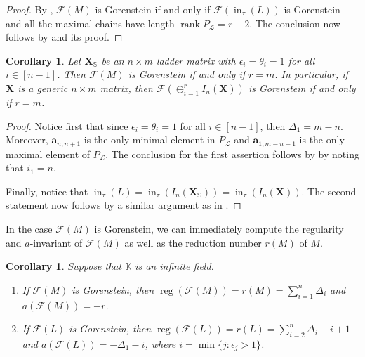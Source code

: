 \documentclass[11pt,a4paper,reqno,dvipsnames]{amsart}
\theoremstyle{plain}
\newtheorem{Corollary}[Theorem]{Corollary}
\theoremstyle{definition}
\newtheorem{Assumptions and Discussion}[Theorem]{Assumptions and Discussion}
\theoremstyle{remark}
\def\ini{\operatorname{in}}
\def\KK{{\mathbb K}}
\newcommand\bda{{\bm a}}
\newcommand\bfX{\mathbf{X}}
\newcommand\bfS{\mathbb{S}}
\newcommand\calF{\mathcal{F}}
\newcommand\calL{\mathcal{L}}
\newcommand{\rank}{\operatorname{rank}}
\def\reg{\operatorname{reg}}
\begin{document}
\begin{proof}
By , $\calF(M)$ is Gorenstein if and only if $\calF(\ini_{\tau}(L))$ is Gorenstein and all the maximal chains have length $\rank P_{\calL}=r-2$. The conclusion now follows by  and its proof.
\end{proof}

 



\begin{Corollary}
    Let $\bfX_{\bfS}$ be an $n\times m$ ladder matrix with $\epsilon_i=\theta_i=1$ for all $i\in [n-1]$.  Then $\calF(M)$ is Gorenstein if and only if $r=m$. In particular, if $\bfX$ is a generic $n\times m$ matrix, then $\calF(\oplus_{i=1}^rI_n(\bfX))$ is Gorenstein if and only if $r=m$.
\end{Corollary}

\begin{proof}
   Notice first that since $\epsilon_i=\theta_i=1$ for all $i\in [n-1]$, then $\Delta_1=m-n$. Moreover, $\bda_{n,n+1}$ is the only minimal element in $P_{\calL}$  and $\bda_{1,m-n+1}$ is the only maximal element of $P_{\calL}$. The conclusion for the first assertion follows by  by noting that $i_1=n$.


Finally, notice that $\ini_{\tau}(L)=\ini_{\tau} (I_n(\bfX_{\bfS}))=\ini_{\tau}(I_n(\bfX))$. The second statement now follows by a similar argument as in .
\end{proof}







In the case $\calF(M)$ is Gorenstein, we can immediately compute the regularity and $a$-invariant of $\calF(M)$ as well as the reduction number $r(M)$ of $M$. 


\begin{Corollary}\label{cor: reg} Suppose that $\KK$ is an infinite field.
 \begin{enumerate}[a]
     \item  If $\calF(M)$ is Gorenstein, then $\reg (\calF(M))=r(M)=\sum_{i=1}^{n}\Delta_i$ and $a(\calF(M))=-r$. 

 \item  If $\calF(L)$ is Gorenstein, then  $\reg (\calF(L))=r(L)=\sum_{i=2}^{n}\Delta_i-i+1$ and $a(\calF(L))=-\Delta_1-i$, where  $i=\min\{j: \epsilon_j>1\}$. 
  \end{enumerate}
\end{Corollary}
\end{document}
